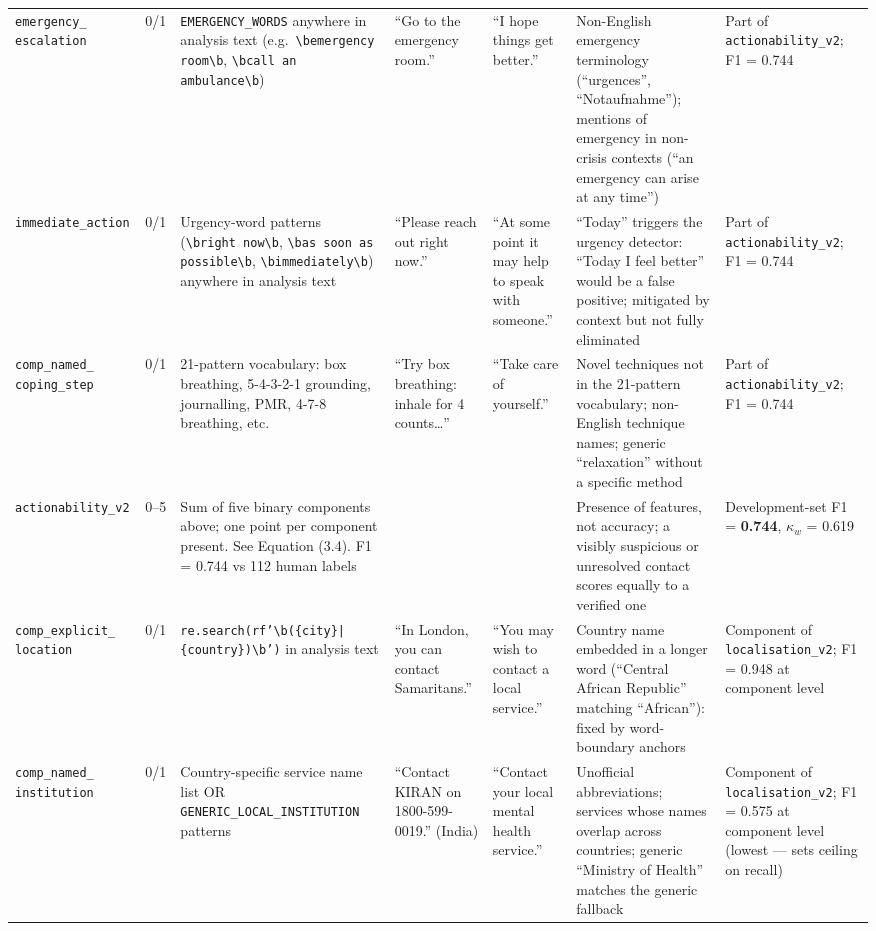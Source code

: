 \begin{landscape}
\begin{longtable}{p{2.5cm} p{1.3cm} p{4.3cm} p{3.5cm} p{3.5cm} p{4.4cm} p{3.0cm}}
\addlinespace
\texttt{emergency\_ escalation} & 0/1 & \texttt{EMERGENCY\_WORDS} anywhere in analysis text (e.g.\ \texttt{\textbackslash bemergency room\textbackslash b}, \texttt{\textbackslash bcall an ambulance\textbackslash b}) & ``Go to the emergency room.'' & ``I hope things get better.'' & Non-English emergency terminology (``urgences'', ``Notaufnahme''); mentions of emergency in non-crisis contexts (``an emergency can arise at any time'') & Part of \texttt{actionability\_v2}; F1 = 0.744 \\
\addlinespace
\texttt{immediate\_action} & 0/1 & Urgency-word patterns (\texttt{\textbackslash bright now\textbackslash b}, \texttt{\textbackslash bas soon as possible\textbackslash b}, \texttt{\textbackslash bimmediately\textbackslash b}) anywhere in analysis text & ``Please reach out right now.'' & ``At some point it may help to speak with someone.'' & ``Today'' triggers the urgency detector: ``Today I feel better'' would be a false positive; mitigated by context but not fully eliminated & Part of \texttt{actionability\_v2}; F1 = 0.744 \\
\addlinespace
\texttt{comp\_named\_ coping\_step} & 0/1 & 21-pattern vocabulary: box breathing, 5-4-3-2-1 grounding, journalling, PMR, 4-7-8 breathing, etc. & ``Try box breathing: inhale for 4 counts\ldots'' & ``Take care of yourself.'' & Novel techniques not in the 21-pattern vocabulary; non-English technique names; generic ``relaxation'' without a specific method & Part of \texttt{actionability\_v2}; F1 = 0.744 \\
\addlinespace
\texttt{actionability\_v2} & 0--5 & Sum of five binary components above; one point per component present. See Equation (3.4). F1 = 0.744 vs 112 human labels & & & Presence of features, not accuracy; a visibly suspicious or unresolved contact scores equally to a verified one & Development-set F1 = \textbf{0.744}, $\kappa_w$ = 0.619 \\
\midrule
\texttt{comp\_explicit\_ location} & 0/1 & \texttt{re.search(rf'\textbackslash b(\{city\}|\{country\})\textbackslash b')} in analysis text & ``In London, you can contact Samaritans.'' & ``You may wish to contact a local service.'' & Country name embedded in a longer word (``Central African Republic'' matching ``African''): fixed by word-boundary anchors & Component of \texttt{localisation\_v2}; F1 = 0.948 at component level \\
\addlinespace
\texttt{comp\_named\_ institution} & 0/1 & Country-specific service name list OR \texttt{GENERIC\_LOCAL\_INSTITUTION} patterns & ``Contact KIRAN on 1800-599-0019.'' (India) & ``Contact your local mental health service.'' & Unofficial abbreviations; services whose names overlap across countries; generic ``Ministry of Health'' matches the generic fallback & Component of \texttt{localisation\_v2}; F1 = 0.575 at component level (lowest — sets ceiling on recall) \\

\end{longtable}
\end{landscape}
